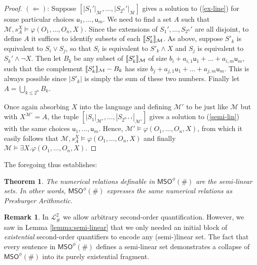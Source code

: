 \documentclass[12pt,oneside,reqno]{amsart}
\newcommand{\semantics}[1]{[\![\mbox{\em $ #1 $\/}]\!]}
\newtheorem{theorem}{Theorem}
\theoremstyle{definition}
\newtheorem{remark}{Remark}
\begin{document}
\begin{proof}
\vspace{1ex}

$(\Leftarrow)$: Suppose $[|S_1'|_{\mathcal{M}},\dots,|S_{2^n}'|_{\mathcal{M}}]$  gives a solution to (\ref{ex-line}) for some particular choices $\mathsf{u}_1,\dots,\mathsf{u}_m$. We need to find a set $A$ such that $\mathcal{M},s^X_A \vDash \varphi(O_1,\dots,O_n,X)$. Since the extensions of $S_1',\dots,S_{2^n}'$ are all disjoint, to define $A$ it suffices to identify subsets of each $\semantics{S_k'}_{\mathcal{M}}$. As above, suppose $S'_k$ is equivalent to $S_i \vee S_j$, so that $S_i$ is equivalent to $S'_k \wedge X$ and $S_j$ is equivalent to $S_k' \wedge \neg X$. Then let $B_k$ be any subset of $\semantics{S_k'}_{\mathcal{M}}$ of size $b_i + a_{i,1}\mathsf{u}_1 + \dots + a_{i,m}\mathsf{u}_m$, such that the complement $\semantics{S'_k}_{\mathcal{M}} - B_k$ has size $b_j + a_{j,1}\mathsf{u}_1 + \dots + a_{j,m}\mathsf{u}_m$. This is always possible since $|S'_k|$ is simply the sum of these two numbers. Finally let $A = \bigcup_{k\leq 2^n} B_k$. 

Once again absorbing $X$ into the language and defining $\mathcal{M}'$ to be just like $\mathcal{M}$ but with $X^{\mathcal{M}'} = A$, the tuple $[|S_1|_{\mathcal{M}'},\dots,|S_{2^{n+1}}|_{\mathcal{M}'}]$ gives a solution to (\ref{semi-lin}) with the same choices $\mathsf{u}_1,\dots,\mathsf{u}_m$. Hence, $\mathcal{M}'\vDash \varphi(O_1,\dots,O_n,X)$, from which it easily follows that $\mathcal{M},s^X_A \vDash \varphi(O_1,\dots,O_n,X)$ and finally $\mathcal{M} \vDash \exists X. \varphi(O_1,\dots,O_n,X)$.
\end{proof}

The foregoing thus establishes:
\begin{theorem} The numerical relations definable in $\mathsf{MSO}^\phi(\#)$ are the semi-linear sets. In other words, $\mathsf{MSO}^\phi(\#)$ expresses the same numerical relations as Presburger Arithmetic. \label{thm:semi-lin} 
\end{theorem}
\begin{remark} \label{remark:soc} In $\mathcal{L}_\#^2$ we allow arbitrary second-order quantification. However, we saw in Lemma \ref{lemma:semi-linear} that we only needed an initial block of \emph{existential} second-order quantifiers to encode any (semi-)linear set. The fact that every sentence in $\mathsf{MSO}^\phi(\#)$ defines a semi-linear set demonstrates a collapse of $\mathsf{MSO}^\phi(\#)$ into its purely existential fragment. 
\end{remark}
\end{document}
